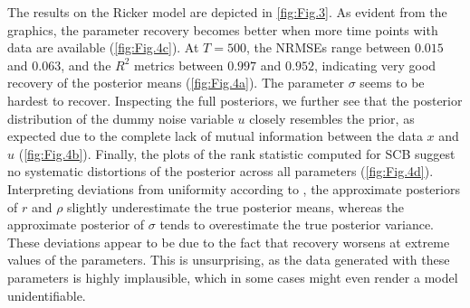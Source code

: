 \documentclass[9pt,twoside,lineno]{pnas-new}
\begin{document}
The results on the Ricker model are depicted in \autoref{fig:Fig.3}. As evident from the graphics, the parameter recovery becomes better when more time points with data are available (\autoref{fig:Fig.4c}). At $T=500$, the NRMSEs range between $0.015$ and $0.063$, and the $R^{2}$ metrics between $0.997$ and $0.952$, indicating very good recovery of the posterior means (\autoref{fig:Fig.4a}). The parameter $\sigma$ seems to be hardest to recover. Inspecting the full posteriors, we further see that the posterior distribution of the dummy noise variable $u$ closely resembles the prior, as expected due to the complete lack of mutual information between the data $x$ and $u$ (\autoref{fig:Fig.4b}). Finally, the plots of the rank statistic computed for SCB suggest no systematic distortions of the posterior across all parameters (\autoref{fig:Fig.4d}). Interpreting deviations from uniformity according to \cite{talts2018validating}, the approximate posteriors of $r$ and $\rho$ slightly underestimate the true posterior means, whereas the approximate posterior of $\sigma$ tends to overestimate the true posterior variance. These deviations appear to be due to the fact that recovery worsens at extreme values of the parameters. This is unsurprising, as the data generated with these parameters is highly implausible, which in some cases might even render a model unidentifiable.
\end{document}
